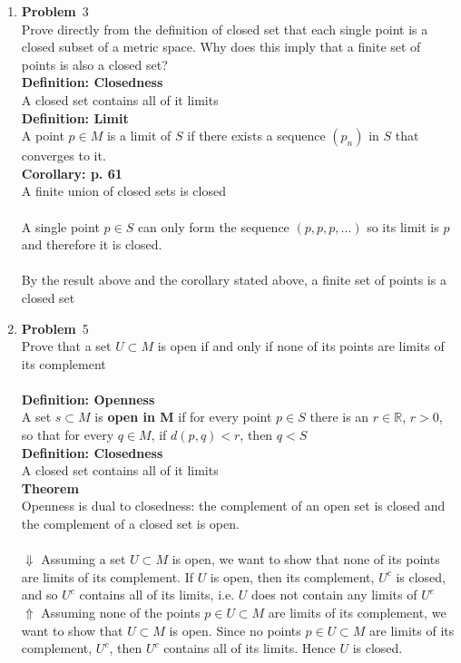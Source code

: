 \documentclass[12pt]{amsart}
\theoremstyle{definition}
\newcommand{\mbR}{\mathbb{R}}
\newcommand{\itep}{\item {\bfseries Problem}\ }
\begin{document}
\begin{enumerate}[series=p]
\itep 3\\
Prove directly from the definition of closed set that each single point is a closed subset of a metric space.  Why does this imply that a finite set of points is also a closed set?
\\
\textbf{Definition: Closedness}\\
A closed set contains all of it limits\\
\textbf{Definition: Limit}\\
A point $p \in M$ is a limit of $S$ if there exists a sequence $(p_n)$ in $S$ that converges to it.\\
\textbf{Corollary: p. 61}\\
A finite union of closed sets is closed
\\\\
A single point $p \in S$ can only form the sequence $(p, p, p, \dots)$ so its limit is $p$ and therefore it is closed.\\
\\
By the result above and the corollary stated above, a finite set of points is a closed set
\newpage


\itep 5\\
Prove that a set $U \subset M$ is open if and only if none of its points are limits of its complement
\\\\
\textbf{Definition: Openness}\\
A set $s \subset M$ is \textbf{open in M} if for every point $p \in S$ there is an $r \in \mbR$, $r>0$, so that for every $q \in M$,
if $d(p,q) < r$, then $q < S$
\\
\textbf{Definition: Closedness}\\
A closed set contains all of it limits\\
\textbf{Theorem}\\
Openness is dual to closedness:  the complement of an open set is closed and the complement of a closed set is open.\\
\\
$\Downarrow$ Assuming a set $U \subset M$ is open, we want to show that none of its points are limits of its complement.  If $U$ is open, then its complement, $U^c$ is closed, and so $U^c$ contains all of its limits, i.e. $U$ does not contain any limits of $U^c$\\
$\Uparrow$ Assuming none of the points $p \in U \subset M$ are limits of its complement, we want to show that $U \subset M$ is open.  Since no points $p \in U \subset M$ are limits of its complement, $U^c$, then $U^c$ contains all of its limits.  Hence $U$ is closed.
\newpage


\end{enumerate}
\end{document}
